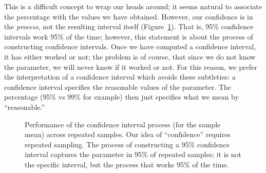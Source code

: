 \documentclass[
  letterpaper,
  DIV=11,
  numbers=noendperiod]{scrreprt}
\theoremstyle{plain}
\theoremstyle{definition}
\theoremstyle{definition}
\theoremstyle{remark}
\begin{document}
This is a difficult concept to wrap our heads around; it seems natural
to associate the percentage with the values we have obtained. However,
our confidence is in the \emph{process}, not the resulting interval
itself (Figure~\ref{fig-samplingdistns-ci-process}). That is, 95\%
confidence intervals work 95\% of the time; however, this statement is
about the process of constructing confidence intervals. Once we have
computed a confidence interval, it has either worked or not; the problem
is of course, that since we do not know the parameter, we will never
know if it worked or not. For this reason, we prefer the interpretation
of a confidence interval which avoids these subtleties: a confidence
interval specifies the reasonable values of the parameter. The
percentage (95\% vs 99\% for example) then just specifies what we mean
by ``reasonable.''

\begin{figure}


\caption{\label{fig-samplingdistns-ci-process}Performance of the
confidence interval process (for the sample mean) across repeated
samples. Our idea of ``confidence'' requires repeated sampling. The
process of constructing a 95\% confidence interval captures the
parameter in 95\% of repeated samples; it is not the specific interval,
but the process that works 95\% of the time.}

\end{figure}%
\end{document}
